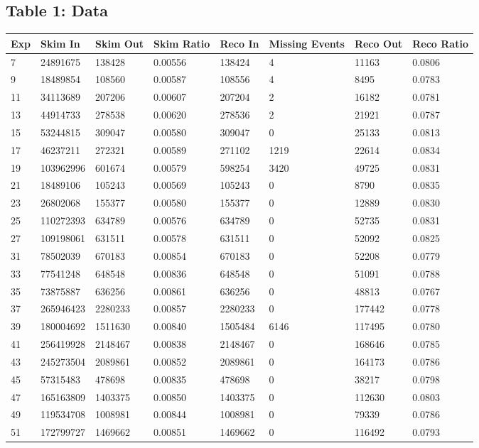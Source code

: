 \documentclass[11pt]{article}
\begin{document}
\subsection{Table 1: Data}
\begin{tabular}{ | l || l | l | l || l | l | l | l |}
  \hline
  Exp&Skim In&Skim Out&Skim Ratio& Reco In&Missing Events&Reco Out&Reco Ratio\\ \hline
  \hline
  7&24891675&138428&0.00556&138424&4&11163&0.0806\\\hline
  9&18489854&108560&0.00587&108556&4&8495&0.0783\\\hline
  11&34113689&207206&0.00607&207204&2&16182&0.0781\\\hline
  13&44914733&278538&0.00620&278536&2&21921&0.0787\\\hline
  15&53244815&309047&0.00580&309047&0&25133&0.0813\\\hline
  17&46237211&272321&0.00589&271102&1219&22614&0.0834\\\hline
  19&103962996&601674&0.00579&598254&3420&49725&0.0831\\\hline
  21&18489106&105243&0.00569&105243&0&8790&0.0835\\\hline
  23&26802068&155377&0.00580&155377&0&12889&0.0830\\\hline
  25&110272393&634789&0.00576&634789&0&52735&0.0831\\\hline
  27&109198061&631511&0.00578&631511&0&52092&0.0825\\\hline
  \hline
  31&78502039&670183&0.00854&670183&0&52208&0.0779\\\hline
  33&77541248&648548&0.00836&648548&0&51091&0.0788\\\hline
  35&73875887&636256&0.00861&636256&0&48813&0.0767\\\hline
  37&265946423&2280233&0.00857&2280233&0&177442&0.0778\\\hline
  39&180004692&1511630&0.00840&1505484&6146&117495&0.0780\\\hline
  41&256419928&2148467&0.00838&2148467&0&168646&0.0785\\\hline
  43&245273504&2089861&0.00852&2089861&0&164173&0.0786\\\hline
  45&57315483&478698&0.00835&478698&0&38217&0.0798\\\hline
  47&165163809&1403375&0.00850&1403375&0&112630&0.0803\\\hline
  49&119534708&1008981&0.00844&1008981&0&79339&0.0786\\\hline
  51&172799727&1469662&0.00851&1469662&0&116492&0.0793\\\hline

\end{tabular}
\end{document}
